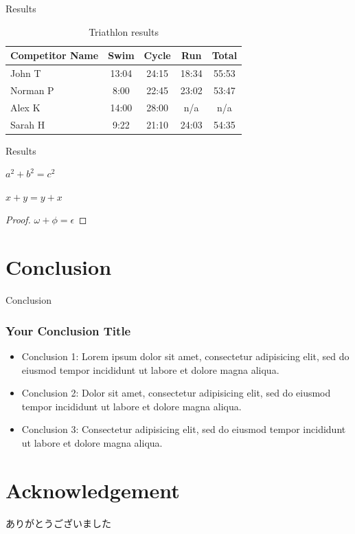 \documentclass[10pt]{beamer}
\begin{document}
\begin{frame}{Results}
    \begin{table}
        \begin{tabular}{l | c | c | c | c }
        Competitor Name & Swim & Cycle & Run & Total \\
        \hline \hline
        John T & 13:04 & 24:15 & 18:34 & 55:53 \\ 
        Norman P & 8:00 & 22:45 & 23:02 & 53:47\\
        Alex K & 14:00 & 28:00 & n/a & n/a\\
        Sarah H & 9:22 & 21:10 & 24:03 & 54:35 
        \end{tabular}
        \caption{Triathlon results}
    \end{table}
\end{frame}

\begin{frame}{Results}
    \begin{theorem}[Pythagoras] 
      $ a^2 + b^2 = c^2$
    \end{theorem}
    \begin{corollary}
     $ x + y = y + x  $
    \end{corollary}
    \begin{proof}
     $\omega +\phi = \epsilon $
    \end{proof}
\end{frame}


\section{Conclusion}

\begin{frame}{Conclusion}
    \frametitle{Your Conclusion Title}
	\begin{itemize}
	    \item Conclusion 1: Lorem ipsum dolor sit amet, consectetur adipisicing elit, sed do eiusmod tempor incididunt ut labore et dolore magna aliqua.
            \item Conclusion 2: Dolor sit amet, consectetur adipisicing elit, sed do eiusmod tempor incididunt ut labore et dolore magna aliqua.
            \item Conclusion 3: Consectetur adipisicing elit, sed do eiusmod tempor incididunt ut labore et dolore magna aliqua.
	\end{itemize}
\end{frame}


\section*{Acknowledgement}  
\begin{frame}
\textcolor{ehimeColor}{\Huge{\centerline{ありがとうございました}}}
\end{frame}
\end{document}
